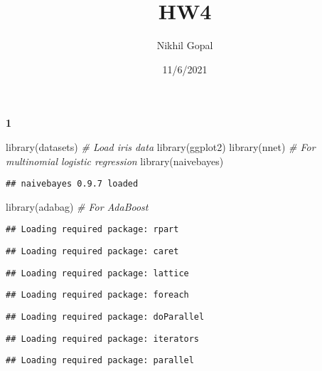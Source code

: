 \documentclass[
]{article}
\title{HW4}
\author{Nikhil Gopal}
\date{11/6/2021}
\newenvironment{Shaded}{\begin{snugshade}}{\end{snugshade}}
\newcommand{\CommentTok}[1]{\textcolor[rgb]{0.56,0.35,0.01}{\textit{#1}}}
\newcommand{\FunctionTok}[1]{\textcolor[rgb]{0.00,0.00,0.00}{#1}}
\newcommand{\NormalTok}[1]{#1}
\begin{document}
\maketitle

\textbf{1}

\begin{Shaded}
\begin{Highlighting}[]
\FunctionTok{library}\NormalTok{(datasets) }\CommentTok{\# Load iris data}
\FunctionTok{library}\NormalTok{(ggplot2)}
\FunctionTok{library}\NormalTok{(nnet) }\CommentTok{\# For multinomial logistic regression}
\FunctionTok{library}\NormalTok{(naivebayes)}
\end{Highlighting}
\end{Shaded}

\begin{verbatim}
## naivebayes 0.9.7 loaded
\end{verbatim}

\begin{Shaded}
\begin{Highlighting}[]
\FunctionTok{library}\NormalTok{(adabag) }\CommentTok{\# For AdaBoost}
\end{Highlighting}
\end{Shaded}

\begin{verbatim}
## Loading required package: rpart
\end{verbatim}

\begin{verbatim}
## Loading required package: caret
\end{verbatim}

\begin{verbatim}
## Loading required package: lattice
\end{verbatim}

\begin{verbatim}
## Loading required package: foreach
\end{verbatim}

\begin{verbatim}
## Loading required package: doParallel
\end{verbatim}

\begin{verbatim}
## Loading required package: iterators
\end{verbatim}

\begin{verbatim}
## Loading required package: parallel
\end{verbatim}
\end{document}
